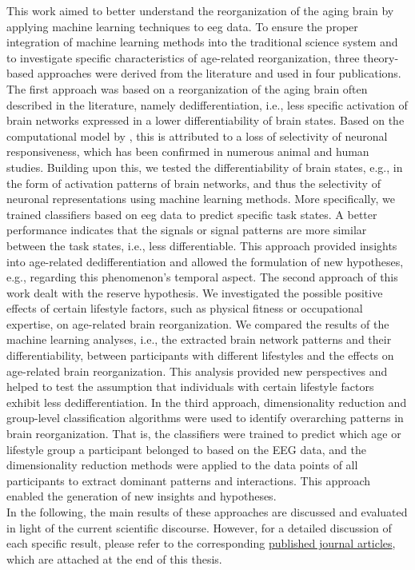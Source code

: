 This work aimed to better understand the reorganization of the aging brain by applying machine learning techniques to \gls{eeg} data. To ensure the proper integration of machine learning methods into the traditional science system and to investigate specific characteristics of age-related reorganization, three theory-based approaches were derived from the literature and used in four publications.\\
The first approach was based on a reorganization of the aging brain often described in the literature, namely dedifferentiation, i.e., less specific activation of brain networks expressed in a lower differentiability of brain states. Based on the computational model by \citeauthor{Li2001} \cite{Li2001, Li2000}, this is attributed to a loss of selectivity of neuronal responsiveness, which has been confirmed in numerous animal and human studies. Building upon this, we tested the differentiability of brain states, e.g., in the form of activation patterns of brain networks, and thus the selectivity of neuronal representations using machine learning methods. More specifically, we trained classifiers based on \gls{eeg} data to predict specific task states. A better performance indicates that the signals or signal patterns are more similar between the task states, i.e., less differentiable. This approach provided insights into age-related dedifferentiation and allowed the formulation of new hypotheses, e.g., regarding this phenomenon's temporal aspect. The second approach of this work dealt with the reserve hypothesis. We investigated the possible positive effects of certain lifestyle factors, such as physical fitness or occupational expertise, on age-related brain reorganization. We compared the results of the machine learning analyses, i.e., the extracted brain network patterns and their differentiability, between participants with different lifestyles and the effects on age-related brain reorganization. This analysis provided new perspectives and helped to test the assumption that individuals with certain lifestyle factors exhibit less dedifferentiation. In the third approach, dimensionality reduction and group-level classification algorithms were used to identify overarching patterns in brain reorganization. That is, the classifiers were trained to predict which age or lifestyle group a participant belonged to based on the EEG data, and the dimensionality reduction methods were applied to the data points of all participants to extract dominant patterns and interactions. This approach enabled the generation of new insights and hypotheses.\\
In the following, the main results of these approaches are discussed and evaluated in light of the current scientific discourse. However, for a detailed discussion of each specific result, please refer to the corresponding \hyperref[pub:papers]{published journal articles}, which are attached at the end of this thesis.

